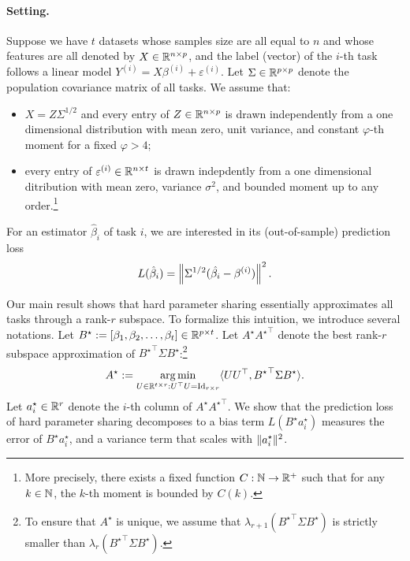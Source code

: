 \paragraph{Setting.} Suppose we have $t$ datasets whose samples size are all equal to $n$ and whose features are all denoted by $X \in \mathbb{R}^{n \times p}$, and the label (vector) of the $i$-th task follows a linear model $Y^{(i)} = X \beta^{(i)} + \varepsilon^{(i)}$.
Let $\Sigma\in \mathbb{R}^{p\times p}$ denote the population covariance matrix of all tasks.
We assume that:
\begin{itemize}
	\item $X = Z \Sigma^{1/2}$ and every entry of $Z \in \mathbb{R}^{n \times p}$ is drawn independently from a one dimensional distribution with mean zero, unit variance, and constant $\varphi$-th moment for a fixed $\varphi > 4$;
	\item every entry of $\varepsilon^{(i)} \in \mathbb{R}^{n \times t}$ is drawn indepdently from a one dimensional ditribution with mean zero, variance $\sigma^2$, and bounded moment up to any order.\footnote{More precisely, there exists a fixed function $C: \mathbb{N} \rightarrow \mathbb{R}^+$ such that for any $k \in \mathbb{N}$, the $k$-th moment is bounded by $C(k)$.}
\end{itemize}
For an estimator $\hat{\beta}_i$ of task $i$, we are interested in its (out-of-sample) prediction loss
\[ L(\hat{\beta}_i) = \left\| \Sigma^{1/2} (\hat{\beta_i} - \beta^{(i)}) \right\|^2. \]

Our main result shows that hard parameter sharing essentially approximates all tasks through a rank-$r$ subspace.
To formalize this intuition, we introduce several notations.
Let $B^\star := [{\beta}_1,{\beta}_2,\dots,{\beta}_{t}] \in \mathbb{R}^{p\times t}$.
Let $A^{\star} {A^{\star}}^{\top}$ denote the best rank-$r$ subspace approximation of ${B^{\star}}^\top\Sigma B^{\star}$:\footnote{To ensure that $A^{\star}$ is unique, we assume that $\lambda_{r+1}({B^\star}^\top \Sigma B^\star)$ is strictly smaller than $\lambda_{r}({B^\star}^\top \Sigma B^\star)$.}
\[ A^{\star} := \operatorname*{arg\,min}_{U\in\mathbb{R}^{t\times r} : U^{\top} U = \operatorname{Id}_{r\times r}} \langle U U^{\top}, {B^{\star}}^{\top} \Sigma B^{\star} \rangle. \]
Let $a_i^{\star} \in\mathbb{R}^r$ denote the $i$-th column of $A^{\star}{A^{\star}}^{\top}$.
We show that the prediction loss of hard parameter sharing decomposes to a bias term $L(B^{\star} a_i^{\star})$ measures the error of $B^{\star} a_i^{\star}$, and a variance term that scales with $\|a_i^{\star}\|^2$.


